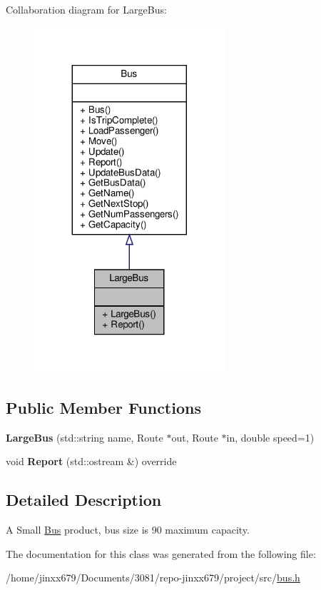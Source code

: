 Collaboration diagram for Large\+Bus\+:\nopagebreak
\begin{figure}[H]
\begin{center}
\leavevmode
\includegraphics[width=200pt]{classLargeBus__coll__graph}
\end{center}
\end{figure}
\subsection*{Public Member Functions}
\begin{DoxyCompactItemize}
\item 
\mbox{\label{classLargeBus_ae1756756d1dbb8db83b4887136e21686}} 
{\bfseries Large\+Bus} (std\+::string name, Route $\ast$out, Route $\ast$in, double speed=1)
\item 
\mbox{\label{classLargeBus_a4e20f9c3199c1099f653f755b618ccea}} 
void {\bfseries Report} (std\+::ostream \&) override
\end{DoxyCompactItemize}


\subsection{Detailed Description}
A Small \hyperlink{classBus}{Bus} product, bus size is 90 maximum capacity. 

The documentation for this class was generated from the following file\+:\begin{DoxyCompactItemize}
\item 
/home/jinxx679/\+Documents/3081/repo-\/jinxx679/project/src/\hyperlink{bus_8h}{bus.\+h}\end{DoxyCompactItemize}
